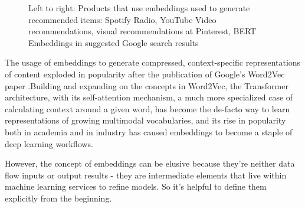 \documentclass[11pt, table]{diazessay} %
\begin{document}
\begin{sloppypar}
\begin{figure}[H]
\caption{Left to right: Products that use embeddings used to generate recommended items: Spotify Radio, YouTube Video recommendations, visual recommendations at Pinterest, BERT Embeddings in suggested Google search results}
\end{figure}

The usage of embeddings to generate compressed, context-specific representations of content exploded in popularity after the publication of Google’s Word2Vec paper \citep{mikolov2013efficient}.Building and expanding on the concepts in Word2Vec, the Transformer \citep{vaswani2017attention} architecture, with its self-attention mechanism, a much more specialized case of calculating context around a given word, has become the de-facto way to learn representations of growing multimodal vocabularies, and its rise in popularity both in academia and in industry has caused embeddings to become a staple of deep learning workflows. 

However, the concept of embeddings can be elusive because they're neither data flow inputs or output results - they are intermediate elements that live within machine learning services to refine models. So it's helpful to define them explicitly from the beginning. 



\end{sloppypar}
\end{document}
